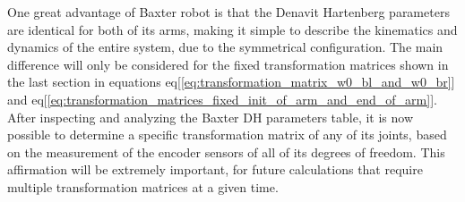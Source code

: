 \documentclass[11pt]{report} %
\begin{document}
\begin{table}[H]
\begin{center}
\caption{\label{tab:dh_params} Denavit Hartenberg Parameters for the arms of Baxter robot. Adapted from \citep{cite_denativ_hartenberg}.}
\end{center}
\end{table}

One great advantage of Baxter robot is that the Denavit Hartenberg parameters are identical for both of its arms, making it simple to describe the kinematics and dynamics of the entire system, due to the symmetrical configuration. The main difference will only be considered for the fixed transformation matrices shown in the last section in equations eq[\ref{eq:transformation_matrix_w0_bl_and_w0_br}] and eq[\ref{eq:transformation_matrices_fixed_init_of_arm_and_end_of_arm}].\\

After inspecting and analyzing the Baxter DH parameters table, it is now possible to determine a specific transformation matrix of any of its joints, based on the measurement of the encoder sensors of all of its degrees of freedom. This affirmation will be extremely important, for future calculations that require multiple transformation matrices at a given time.\\ 
\end{document}
